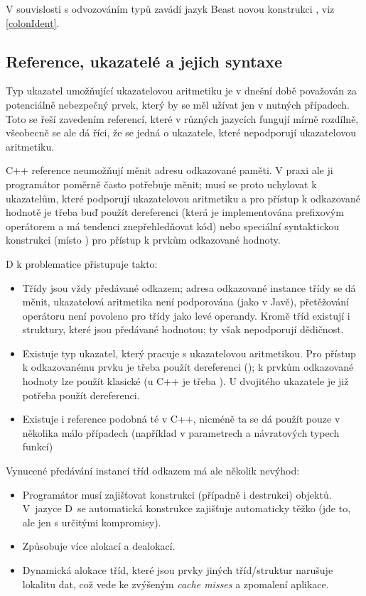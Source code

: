 V souvislosti s odvozováním typů zavádí jazyk Beast novou konstrukci , viz \autoref{colonIdent}.

\subsection{Reference, ukazatelé a jejich syntaxe} \label{pointers}
Typ ukazatel umožňující ukazatelovou aritmetiku je v dnešní době považován za potenciálně nebezpečný prvek, který by se měl užívat jen v nutných případech. Toto se řeší zavedením referencí, které v různých jazycích fungují mírně rozdílně, všeobecně se ale dá říci, že se jedná o ukazatele, které nepodporují ukazatelovou aritmetiku.

C++ reference neumožňují měnit adresu odkazované paměti. V praxi ale ji programátor poměrně často potřebuje měnit; musí se proto uchylovat k ukazatelům, které podporují ukazatelovou aritmetiku a pro přístup k odkazované hodnotě je třeba buď použít dereferenci (která je implementována prefixovým operátorem  a má tendenci znepřehledňovat kód) nebo speciální syntaktickou konstrukci (místo  ) pro přístup k prvkům odkazované hodnoty.

D k problematice přistupuje takto:
\begin{itemize}
	\item Třídy jsou vždy předávané odkazem; adresa odkazované instance třídy se dá měnit, ukazatelová aritmetika není podporována (jako v Javě), přetěžování operátoru  není povoleno pro třídy jako levé operandy. Kromě tříd existují i struktury, které jsou předávané hodnotou; ty však nepodporují dědičnost.
	\item Existuje typ ukazatel, který pracuje s ukazatelovou aritmetikou. Pro přístup k odkazovanému prvku je třeba použít dereferenci (); k prvkům odkazované hodnoty lze použít klasické  (u C++ je třeba ). U dvojitého ukazatele je již potřeba použít dereferenci.
	\item Existuje i reference podobná té v C++, nicméně ta se dá použít pouze v několika málo případech (například v parametrech a návratových typech funkcí)
\end{itemize}

Vynucené předávání instancí tříd odkazem má ale několik nevýhod:
\begin{itemize}
	\item Programátor musí zajišťovat konstrukci (případně i destrukci) objektů. V~jazyce D~se automatická konstrukce zajišťuje automaticky těžko (jde to, ale jen s určitými kompromisy).
	\item Způsobuje více alokací a dealokací.
	\item Dynamická alokace tříd, které jsou prvky jiných tříd/struktur narušuje lokalitu dat, což vede ke zvýšeným \textit{cache misses} a zpomalení aplikace.
\end{itemize}

